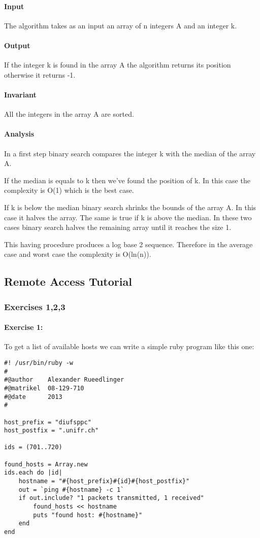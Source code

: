 \documentclass[12pt]{article}
\begin{document}
\paragraph{Input}
The algorithm takes as an input an array of n integers A and an integer k.

\paragraph{Output}
If the integer k is found in the array A the algorithm returns its position otherwise it returns -1.

\paragraph{Invariant}
All the integers in the array A are sorted.

\paragraph{Analysis}
In a first step binary search compares the integer k with the median of the array A.

If the median is equals to k then we've found the position of k. In this case the complexity is O(1) which is the best case.

If k is below the median binary search shrinks the bounds of the array A.
In this case it halves the array. The same is true if k is above the median.
In these two cases binary search halves the remaining array until it reaches the size 1.

This having procedure produces a log base 2 sequence. Therefore in the average case and worst case the complexity is O(ln(n)).

\newpage
\subsection*{Remote Access Tutorial}
\subsubsection*{Exercises 1,2,3}
\paragraph*{Exercise 1:}

To get a list of available hosts we can write a simple ruby program like this one:
\begin{lstlisting}
#! /usr/bin/ruby -w
#
#@author	Alexander Rueedlinger
#@matrikel	08-129-710
#@date		2013
#

host_prefix = "diufsppc"
host_postfix = ".unifr.ch"

ids = (701..720)

found_hosts = Array.new
ids.each do |id|
	hostname = "#{host_prefix}#{id}#{host_postfix}"
	out = `ping #{hostname} -c 1`
	if out.include? "1 packets transmitted, 1 received"
		found_hosts << hostname
		puts "found host: #{hostname}"	
	end
end
\end{lstlisting}
\end{document}

